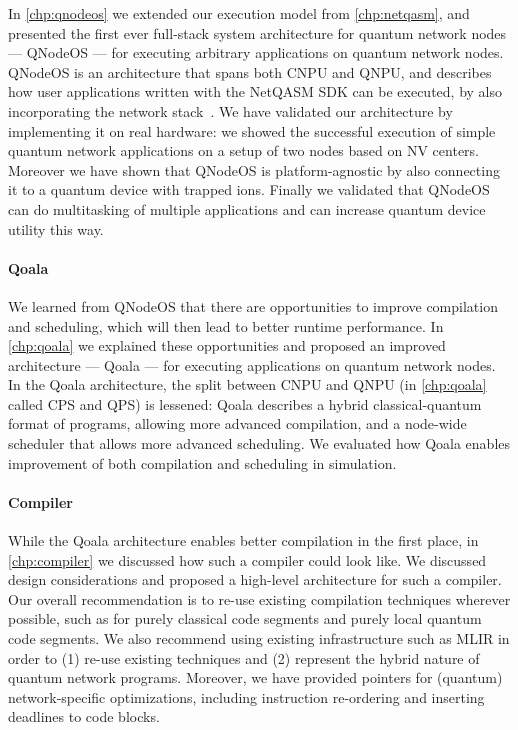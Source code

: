 In \cref{chp:qnodeos} we extended our execution model from \cref{chp:netqasm}, and presented the first ever full-stack system architecture for quantum network nodes --- QNodeOS --- for executing arbitrary applications on quantum network nodes.
QNodeOS is an architecture that spans both CNPU and QNPU, and describes how user applications written with the NetQASM SDK can be executed, by also incorporating the network stack~\cite{dahlberg2019linklayer,kozlowski2020networklayer}.
We have validated our architecture by implementing it on real hardware: we showed the successful execution of simple quantum network applications on a setup of two nodes based on NV centers.
Moreover we have shown that QNodeOS is platform-agnostic by also connecting it to a quantum device with trapped ions.
Finally we validated that QNodeOS can do multitasking of multiple applications and can increase quantum device utility this way.

\paragraph{Qoala}
We learned from QNodeOS that there are opportunities to improve compilation and scheduling, which will then lead to better runtime performance.
In \cref{chp:qoala} we explained these opportunities and proposed an improved architecture --- Qoala --- for executing applications on quantum network nodes.
In the Qoala architecture, the split between CNPU and QNPU (in \cref{chp:qoala} called CPS and QPS) is lessened: Qoala describes a hybrid classical-quantum format of programs, allowing more advanced compilation, and a node-wide scheduler that allows more advanced scheduling.
We evaluated how Qoala enables improvement of both compilation and scheduling in simulation.

\paragraph{Compiler}
While the Qoala architecture enables better compilation in the first place, in \cref{chp:compiler} we discussed how such a compiler could look like.
We discussed design considerations and proposed a high-level architecture for such a compiler.
Our overall recommendation is to re-use existing compilation techniques wherever possible, such as for purely classical code segments and purely local quantum code segments.
We also recommend using existing infrastructure such as MLIR in order to (1) re-use existing techniques and (2) represent the hybrid nature of quantum network programs.
Moreover, we have provided pointers for (quantum) network-specific optimizations, including instruction re-ordering and inserting deadlines to code blocks.




